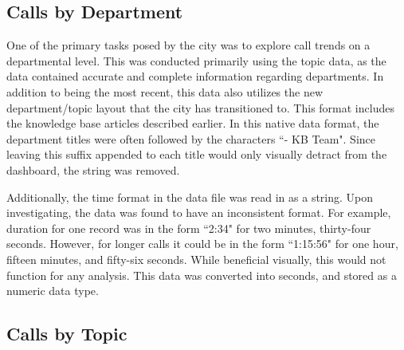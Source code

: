 \documentclass{article}
\begin{document}
	\subsection{Calls by Department}

One of the primary tasks posed by the city was to explore call trends on a departmental level.  This was conducted primarily using the topic data, as the data contained accurate and complete information regarding departments.  In addition to being the most recent, this data also utilizes the new department/topic layout that the city has transitioned to.  This format includes the knowledge base articles described earlier.  In this native data format, the department titles were often followed by the characters ``- KB Team".  Since leaving this suffix appended to each title would only visually detract from the dashboard, the string was removed.  
\par
Additionally, the time format in the data file was read in as a string.  Upon investigating, the data was found to have an inconsistent format.  For example, duration for one record was in the form ``2:34" for two minutes, thirty-four seconds.  However, for longer calls it could be in the form ``1:15:56" for one hour, fifteen minutes, and fifty-six seconds.  While beneficial visually, this would not function for any analysis.  This data was converted into seconds, and stored as a numeric data type.

	\subsection{Calls by Topic}
\end{document}
